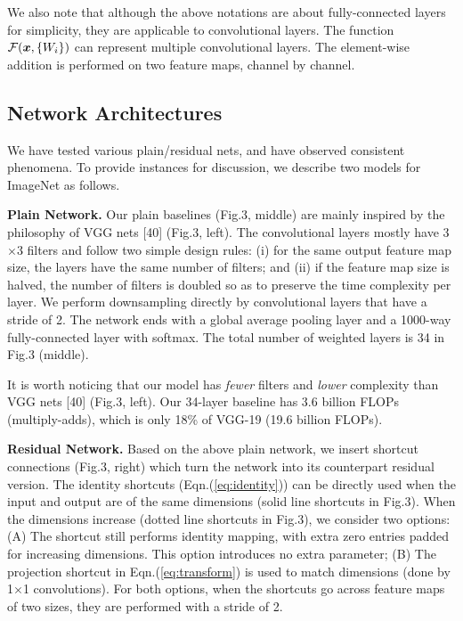 We also note that although the above notations are about fully-connected layers for simplicity, they are applicable to convolutional layers. The function $\mathcal{F}(\boldsymbol{x}, \{W_{i}\})$ can represent multiple convolutional layers. The element-wise addition is performed on two feature maps, channel by channel.

\subsection{Network Architectures}

We have tested various plain/residual nets, and have observed consistent phenomena. To provide instances for discussion, we describe two models for ImageNet as follows.

\vspace{6pt}
\noindent\textbf{Plain Network.}
Our plain baselines (Fig.3, middle) are mainly inspired by the philosophy of VGG nets [40] (Fig.3, left).
The convolutional layers mostly have 3$\times$3 filters and follow two simple design rules: (i) for the same output feature map size, the layers have the same number of filters; and (ii) if the feature map size is halved, the number of filters is doubled so as to preserve the time complexity per layer. We perform downsampling directly by convolutional layers that have a stride of 2.
The network ends with a global average pooling layer and a 1000-way fully-connected layer with softmax. The total number of weighted layers is 34 in Fig.3 (middle).

It is worth noticing that our model has \emph{fewer} filters and \emph{lower} complexity than VGG nets [40] (Fig.3, left). Our 34-layer baseline has 3.6 billion FLOPs (multiply-adds), which is only 18\% of VGG-19 (19.6 billion FLOPs).

\vspace{6pt}
\noindent\textbf{Residual Network.}
Based on the above plain network, we insert shortcut connections (Fig.3, right) which turn the network into its counterpart residual version.
The identity shortcuts (Eqn.(\ref{eq:identity})) can be directly used when the input and output are of the same dimensions (solid line shortcuts in Fig.3).
When the dimensions increase (dotted line shortcuts in Fig.3), we consider two options:
(A) The shortcut still performs identity mapping, with extra zero entries padded for increasing dimensions. This option introduces no extra parameter;
(B) The projection shortcut in Eqn.(\ref{eq:transform}) is used to match dimensions (done by 1$\times$1 convolutions).
For both options, when the shortcuts go across feature maps of two sizes, they are performed with a stride of 2.

